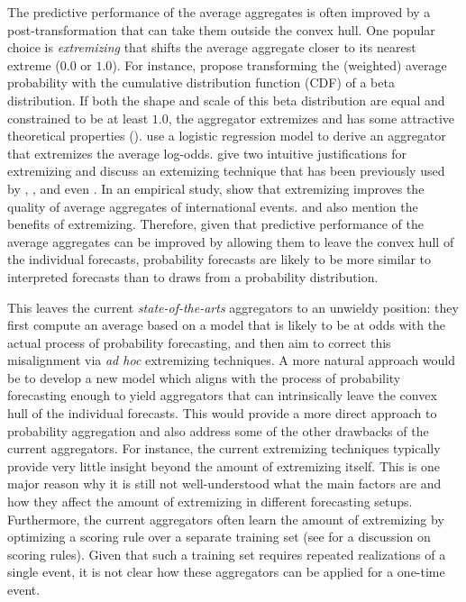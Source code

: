 \documentclass[11pt]{article}
\theoremstyle{definition}
\theoremstyle{definition}
\begin{document}
The predictive performance of the average aggregates is often improved by a post-transformation that can take them outside the convex hull. One popular choice is \textit{extremizing} that shifts the average aggregate closer to its nearest extreme ($0.0$ or $1.0$). 
For instance, \citet{Ranjan08} propose transforming the (weighted) average probability with the cumulative distribution function (CDF) of a beta distribution. If both the shape and scale of this beta distribution are equal and constrained to be at least $1.0$,  the aggregator extremizes and has some attractive theoretical properties (\citet{Wallsten2001}). \citet{satopaa} use a logistic regression model to derive an aggregator that extremizes the average log-odds. \citet{baron2014two} give two intuitive justifications for extremizing and discuss an extemizing technique that has been previously used by \citet{Erev1994}, \citet{shlomi2010subjective}, and even \citet{karmarkar1978subjectively}. In an empirical study, \citet{mellers2014psychological} show that extremizing  improves the quality of average aggregates of international events.   \citet{turner2013forecast} and \citet{Ariely00theeffects} also mention the benefits of extremizing. Therefore, given that predictive performance of the average aggregates can be improved by allowing them to leave the convex hull of the individual forecasts, probability forecasts are likely to be more similar to interpreted forecasts than to draws from a probability distribution. 



This leaves the current \textit{state-of-the-arts} aggregators to an unwieldy position: they first compute an average based on a model that is likely to be at odds with the actual process of probability forecasting, and then aim to correct this misalignment via \textit{ad hoc} extremizing techniques. A more natural approach would be to develop a new model which aligns with the process of probability forecasting enough to yield aggregators that can intrinsically leave the convex hull of the individual forecasts. This would provide a more direct approach to probability aggregation and also address some of the other drawbacks of the current aggregators. For instance, the current extremizing techniques typically provide very little insight beyond the amount of extremizing itself. This is one major reason why it is still not well-understood what the main factors are and how they affect the amount of extremizing in different forecasting setups. Furthermore, the current aggregators often learn the amount of extremizing  by optimizing a scoring rule over a separate training set (see \citet{Gneiting04strictlyproper} for a discussion on scoring rules). Given that such a training set requires repeated realizations of a single event, it is not clear how these aggregators can be applied for a one-time event.
\end{document}
